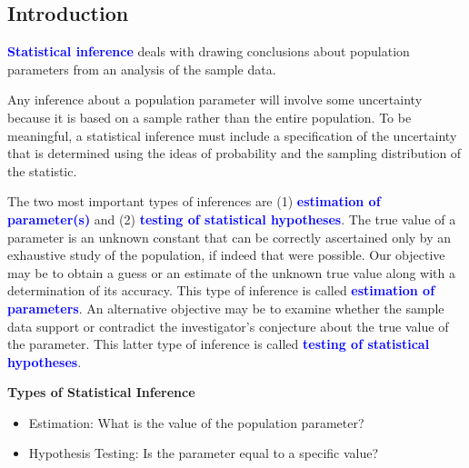 \documentclass[12pt,a4paper]{article}
\begin{document}
\subsection{Introduction}
\begin{tcolorbox}[colback=white]
	\textcolor{blue}{\bf Statistical inference} deals with drawing conclusions about population
	parameters from an analysis of the sample data.
\end{tcolorbox}
Any inference about a population parameter will involve some uncertainty because it is based on a sample rather than the entire population. To be meaningful, a statistical inference must include a specification of the uncertainty that is determined using the ideas of probability and the sampling distribution of the statistic.
\par
The two most important types of inferences are (1) \textcolor{blue}{\bf estimation of
parameter(s)} and (2) \textcolor{blue}{\bf testing of statistical hypotheses}. The true value of a parameter is an unknown constant that can be correctly ascertained only by an exhaustive study of the population, if indeed that were possible. Our objective may be to obtain a guess or an estimate of the unknown true value along with a
determination of its accuracy. This type of inference is called \textcolor{blue}{\bf estimation of parameters}. An alternative objective may be to examine whether the sample data support or contradict the investigator’s conjecture about the true value of the parameter. This latter type of inference is called 
\textcolor{blue}{\bf testing of statistical hypotheses}.\\

\begin{tcolorbox}[colback=white]\begin{center}
		\bf Types of Statistical Inference
	\end{center}\begin{itemize}\bf
	\item Estimation: What is the value of the population parameter?
	\item Hypothesis Testing: Is the parameter equal to a specific value?
\end{itemize}
\end{tcolorbox}
\end{document}
